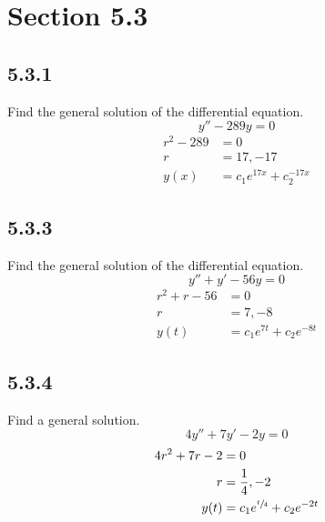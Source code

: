 \documentclass{article}
\begin{document}
\newcommand{\hr}{\par\noindent\rule{\textwidth}{0.4pt}}

\newcommand{\bc}[1]{
	\begin{equation*}
		\begin{boxed}
			{#1}
		\end{boxed}
	\end{equation*}
}

\newcommand{\cond}[2]{
	\ifmmode
		{#1} \quad {#2}
	\else
		$$ {#1} \quad {#2} $$
	\fi
}

\newcommand{\iu}{\mathrm{i}\mkern1mu}

\tableofcontents

\section{Section 5.3}

\subsection{5.3.1}
Find the general solution of the differential equation.
$$ y'' - 289y = 0 $$
\begin{align*}
	r^2 - 289 & = 0 \\
	r & = 17, -17 \\
	y(x) & = c_1e^{17x} + c_2^{-17x}
\end{align*}

\subsection{5.3.3}
Find the general solution of the differential equation.
$$ y'' + y' - 56y = 0 $$
\begin{align*}
	r^2 + r - 56 & = 0 \\
	r & = 7, -8 \\
	y(t) & = c_1e^{7t} + c_2e^{-8t}
\end{align*}

\subsection{5.3.4}
Find a general solution.
$$ 4y'' + 7y' - 2y = 0 $$
\begin{align*}
	4r^2 + 7r - 2 & = 0 \\
	r & = \frac{1}{4}, -2 \\
	y(t) & = c_1e^{\sfrac{t}{4}} + c_2e^{-2t}
\end{align*}
\end{document}
